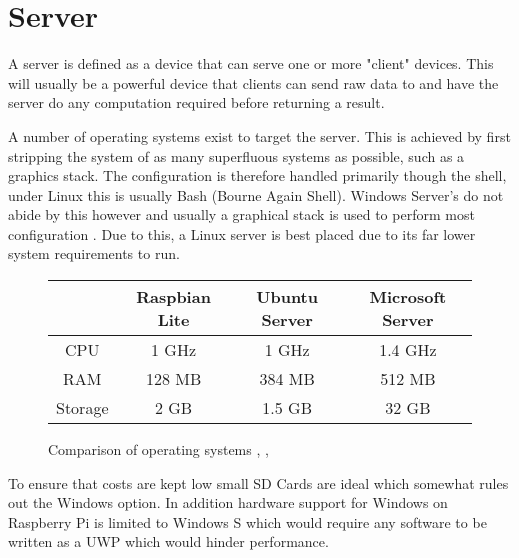 \section{Server}

A server is defined as a device that can serve one or more "client" devices. This will usually be a powerful device that clients can send raw data to and have the server do any computation required before returning a result. \citep{Raymond2003} 

A number of operating systems exist to target the server. This is achieved by first stripping the system of as many superfluous systems as possible, such as a graphics stack. \citep{Guide2016} The configuration is therefore handled primarily though the shell, under Linux this is usually Bash (Bourne Again Shell). Windows Server's do not abide by this however and usually a graphical stack is used to perform most configuration \citep{MicrosoftCorporation2017}. Due to this, a Linux server is best placed due to its far lower system requirements to run.\\
\begin{figure}[H]
	\centering
	\begin{tabular}{cccc}
		\hline 
		& \textbf{Raspbian Lite} & \textbf{Ubuntu Server} & \textbf{Microsoft Server} \\ 
		\hline 
		CPU & 1 GHz & 1 GHz & 1.4 GHz \\ 
		RAM & 128 MB & 384 MB & 512 MB \\ 
		Storage & 2 GB & 1.5 GB & 32 GB \\ 
		\hline 
	\end{tabular}
		\caption{ Comparison of operating systems \citep{Debian2018}, \citep{Guide2016}, \citep{MicrosoftCorporation2018}}
	\label{fig:oscompare}
\end{figure}
To ensure that costs are kept low small SD Cards are ideal which somewhat rules out the Windows option. In addition hardware support for Windows on Raspberry Pi is limited to Windows S \citep{MicrosoftCorporation2017b} which would require any software to be written as a UWP \citep{MicrosoftCorporation2017a} which would hinder performance.
